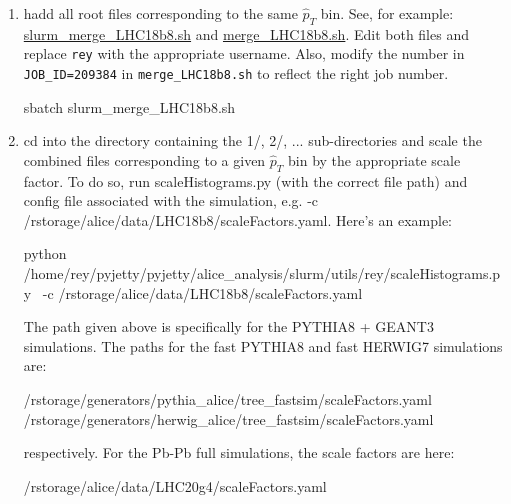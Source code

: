 \documentclass[12pt]{article}
\begin{document}
\begin{enumerate}
\item hadd all root files corresponding to the same $\hat{p}_T$ bin.
See, for example: \href{https://github.com/reynier0611/pyjetty/blob/master/pyjetty/alice_analysis/slurm/utils/rey/slurm_merge_LHC18b8.sh}{slurm\_merge\_LHC18b8.sh} and
\href{https://github.com/reynier0611/pyjetty/blob/master/pyjetty/alice_analysis/slurm/utils/rey/merge_LHC18b8.sh}{merge\_LHC18b8.sh}.
Edit both files and replace \verb|rey| with the appropriate username. Also, modify the number in \verb|JOB_ID=209384| in \verb|merge_LHC18b8.sh| to reflect the right job number.

\begin{tcolorbox}
\begin{verbnobox}[\scriptsize]
sbatch slurm_merge_LHC18b8.sh
\end{verbnobox}  
\end{tcolorbox}

\item cd into the directory containing the 1/, 2/, ... sub-directories and scale the combined files corresponding to a given $\hat{p}_T$ bin by the appropriate scale factor.
To do so, run scaleHistograms.py (with the correct file path) and config file associated with the simulation, e.g. -c /rstorage/alice/data/LHC18b8/scaleFactors.yaml.
Here's an example:

\begin{tcolorbox}
\begin{verbnobox}[\scriptsize]
python /home/rey/pyjetty/pyjetty/alice_analysis/slurm/utils/rey/scaleHistograms.py \
-c /rstorage/alice/data/LHC18b8/scaleFactors.yaml
\end{verbnobox}  
\end{tcolorbox}

The path given above is specifically for the PYTHIA8 + GEANT3 simulations. The paths for the fast PYTHIA8 and fast HERWIG7 simulations are:

\begin{tcolorbox}
\begin{verbnobox}[\scriptsize]
/rstorage/generators/pythia_alice/tree_fastsim/scaleFactors.yaml
/rstorage/generators/herwig_alice/tree_fastsim/scaleFactors.yaml
\end{verbnobox}  
\end{tcolorbox}

respectively. For the Pb-Pb full simulations, the scale factors are here:

\begin{tcolorbox}
\begin{verbnobox}[\scriptsize]
/rstorage/alice/data/LHC20g4/scaleFactors.yaml
\end{verbnobox}  
\end{tcolorbox}


\end{enumerate}
\end{document}
